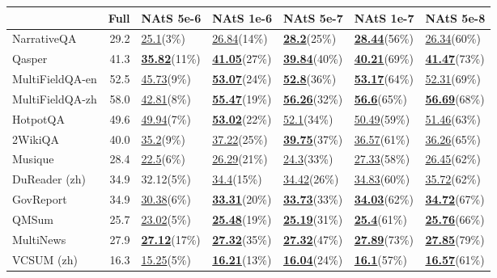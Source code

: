 \begin{tabular}{lrlllll}
\toprule
 & Full & NAtS 5e-6 & NAtS 1e-6 & NAtS 5e-7 & NAtS 1e-7 & NAtS 5e-8 \\
\midrule
NarrativeQA & 29.2 & \underline{25.1}(3\%) & \underline{26.84}(14\%) & \underline{\textbf{28.2}}(25\%) & \underline{\textbf{28.44}}(56\%) & \underline{26.34}(60\%) \\
Qasper & 41.3 & \underline{\textbf{35.82}}(11\%) & \underline{\textbf{41.05}}(27\%) & \underline{\textbf{39.84}}(40\%) & \underline{\textbf{40.21}}(69\%) & \underline{\textbf{41.47}}(73\%) \\
MultiFieldQA-en & 52.5 & \underline{45.73}(9\%) & \underline{\textbf{53.07}}(24\%) & \underline{\textbf{52.8}}(36\%) & \underline{\textbf{53.17}}(64\%) & \underline{52.31}(69\%) \\
MultiFieldQA-zh & 58.0 & \underline{42.81}(8\%) & \underline{\textbf{55.47}}(19\%) & \underline{\textbf{56.26}}(32\%) & \underline{\textbf{56.6}}(65\%) & \underline{\textbf{56.69}}(68\%) \\
HotpotQA & 49.6 & \underline{49.94}(7\%) & \underline{\textbf{53.02}}(22\%) & \underline{52.1}(34\%) & \underline{50.49}(59\%) & \underline{51.46}(63\%) \\
2WikiQA & 40.0 & \underline{35.2}(9\%) & \underline{37.22}(25\%) & \underline{\textbf{39.75}}(37\%) & \underline{36.57}(61\%) & \underline{36.26}(65\%) \\
Musique & 28.4 & \underline{22.5}(6\%) & \underline{26.29}(21\%) & \underline{24.3}(33\%) & \underline{27.33}(58\%) & \underline{26.45}(62\%) \\
DuReader (zh) & 34.9 & 32.12(5\%) & \underline{34.4}(15\%) & \underline{34.42}(26\%) & \underline{34.83}(60\%) & \underline{35.72}(62\%) \\
GovReport & 34.9 & \underline{30.38}(6\%) & \underline{\textbf{33.31}}(20\%) & \underline{\textbf{33.73}}(33\%) & \underline{\textbf{34.03}}(62\%) & \underline{\textbf{34.72}}(67\%) \\
QMSum & 25.7 & \underline{23.02}(5\%) & \underline{\textbf{25.48}}(19\%) & \underline{\textbf{25.19}}(31\%) & \underline{\textbf{25.4}}(61\%) & \underline{\textbf{25.76}}(66\%) \\
MultiNews & 27.9 & \underline{\textbf{27.12}}(17\%) & \underline{\textbf{27.32}}(35\%) & \underline{\textbf{27.32}}(47\%) & \underline{\textbf{27.89}}(73\%) & \underline{\textbf{27.85}}(79\%) \\
VCSUM (zh) & 16.3 & \underline{15.25}(5\%) & \underline{\textbf{16.21}}(13\%) & \underline{\textbf{16.04}}(24\%) & \underline{\textbf{16.1}}(57\%) & \underline{\textbf{16.57}}(61\%) \\

\end{tabular}
